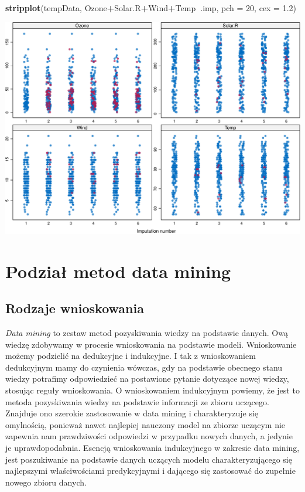 \documentclass[
]{book}
\newenvironment{Shaded}{\begin{snugshade}}{\end{snugshade}}
\newcommand{\DataTypeTok}[1]{\textcolor[rgb]{0.13,0.29,0.53}{#1}}
\newcommand{\DecValTok}[1]{\textcolor[rgb]{0.00,0.00,0.81}{#1}}
\newcommand{\FloatTok}[1]{\textcolor[rgb]{0.00,0.00,0.81}{#1}}
\newcommand{\KeywordTok}[1]{\textcolor[rgb]{0.13,0.29,0.53}{\textbf{#1}}}
\newcommand{\NormalTok}[1]{#1}
\newcommand{\OperatorTok}[1]{\textcolor[rgb]{0.81,0.36,0.00}{\textbf{#1}}}
\theoremstyle{plain}
\theoremstyle{definition}
\theoremstyle{definition}
\theoremstyle{definition}
\theoremstyle{definition}
\theoremstyle{remark}
\begin{document}
\begin{Shaded}
\begin{Highlighting}[]
\KeywordTok{stripplot}\NormalTok{(tempData, Ozone}\OperatorTok{+}\NormalTok{Solar.R}\OperatorTok{+}\NormalTok{Wind}\OperatorTok{+}\NormalTok{Temp}\OperatorTok{~}\NormalTok{.imp, }\DataTypeTok{pch =} \DecValTok{20}\NormalTok{, }\DataTypeTok{cex =} \FloatTok{1.2}\NormalTok{)}
\end{Highlighting}
\end{Shaded}

\includegraphics{EksploracjaDanych_files/figure-latex/unnamed-chunk-9-2.pdf}

\hypertarget{podziaux142-metod-data-mining}{%
\chapter{Podział metod data mining}\label{podziaux142-metod-data-mining}}

\hypertarget{rodzaje-wnioskowania}{%
\section{Rodzaje wnioskowania}\label{rodzaje-wnioskowania}}

\emph{Data mining} to zestaw metod pozyskiwania wiedzy na podstawie danych. Ową wiedzę zdobywamy w procesie wnioskowania na podstawie modeli. Wnioskowanie możemy podzielić na dedukcyjne i indukcyjne. I tak z wnioskowaniem dedukcyjnym mamy do czynienia wówczas, gdy na podstawie obecnego stanu wiedzy potrafimy odpowiedzieć na postawione pytanie dotyczące nowej wiedzy, stosując reguły wnioskowania. O wnioskowaniem indukcyjnym powiemy, że jest to metoda pozyskiwania wiedzy na podstawie informacji ze zbioru uczącego. Znajduje ono szerokie zastosowanie w data mining i charakteryzuje się omylnością, ponieważ nawet najlepiej nauczony model na zbiorze uczącym nie zapewnia nam prawdziwości odpowiedzi w przypadku nowych danych, a jedynie je uprawdopodabnia. Esencją wnioskowania indukcyjnego w zakresie data mining, jest poszukiwanie na podstawie danych uczących modelu charakteryzującego się najlepszymi właściwościami predykcyjnymi i dającego się zastosować do zupełnie nowego zbioru danych.
\end{document}
